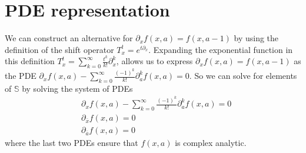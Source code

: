 \documentclass[%
 onecolumn,
 amsmath, amssymb, aps, pra, 10pt
]{revtex4-2}
\begin{document}
\section*{PDE representation}
We can construct an alternative for $\partial_x f(x, a) = f(x, a - 1)$ by using the definition of the shift operator $T_{x}^{t} = e^{t \partial_x}$. Expanding the exponential function in this definition $T_{x}^t = \sum_{k=0}^{\infty} \frac{t^k}{k!} \partial_{x}^{k}$, allows us to express $\partial_x f(x, a) = f(x, a - 1)$ as the PDE $\partial_x f(x, a) - \sum_{k=0}^{\infty} \frac{(-1)^k}{k!}\partial_{a}^{k} f(x, a) = 0$. So we can solve for elements of $\mathbb{S}$ by solving the system of PDEs
\begin{align*}
&\partial_x f(x, a) - \sum_{k=0}^{\infty} \frac{(-1)^k}{k!} \partial_{a}^{k} f(x, a) = 0 \\
&\partial_{\bar{x}} f(x, a) = 0 \\
&\partial_{\bar{a}} f(x, a) = 0
\end{align*}
where the last two PDEs ensure that $f(x, a)$ is complex analytic.
\end{document}
